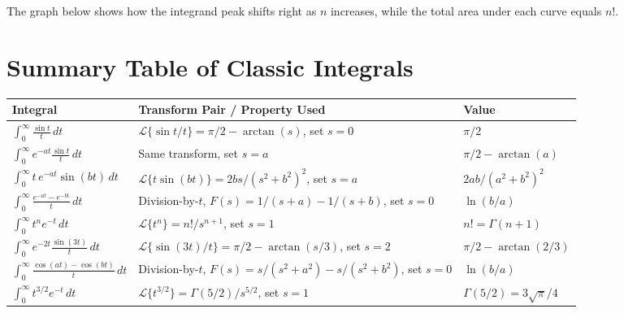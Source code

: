 \documentclass[12pt,a4paper]{article}
\begin{document}
The graph below shows how the integrand peak shifts right as $n$ increases, while
the total area under each curve equals $n!$.

\begin{center}
\end{center}

\section{Summary Table of Classic Integrals}

\begin{center}
\begin{tabular}{@{}p{5.5cm} p{5.5cm} p{3.5cm}@{}}
\toprule
\textbf{Integral} & \textbf{Transform Pair / Property Used} & \textbf{Value} \\
\midrule
$\displaystyle\int_0^\infty \frac{\sin t}{t}\, dt$
  & $\mathcal{L}\{\sin t/t\} = \pi/2 - \arctan(s)$, set $s = 0$
  & $\pi/2$ \\
\midrule
$\displaystyle\int_0^\infty e^{-at}\frac{\sin t}{t}\, dt$
  & Same transform, set $s = a$
  & $\pi/2 - \arctan(a)$ \\
\midrule
$\displaystyle\int_0^\infty t\,e^{-at}\sin(bt)\, dt$
  & $\mathcal{L}\{t\sin(bt)\} = 2bs/(s^2+b^2)^2$, set $s = a$
  & $2ab/(a^2+b^2)^2$ \\
\midrule
$\displaystyle\int_0^\infty \frac{e^{-at}-e^{-bt}}{t}\, dt$
  & Division-by-$t$, $F(s)=1/(s{+}a)-1/(s{+}b)$, set $s=0$
  & $\ln(b/a)$ \\
\midrule
$\displaystyle\int_0^\infty t^n e^{-t}\, dt$
  & $\mathcal{L}\{t^n\} = n!/s^{n+1}$, set $s = 1$
  & $n! = \Gamma(n+1)$ \\
\midrule
$\displaystyle\int_0^\infty e^{-2t}\frac{\sin(3t)}{t}\, dt$
  & $\mathcal{L}\{\sin(3t)/t\} = \pi/2-\arctan(s/3)$, set $s=2$
  & $\pi/2 - \arctan(2/3)$ \\
\midrule
$\displaystyle\int_0^\infty \frac{\cos(at)-\cos(bt)}{t}\, dt$
  & Division-by-$t$, $F(s)=s/(s^2+a^2)-s/(s^2+b^2)$, set $s=0$
  & $\ln(b/a)$ \\
\midrule
$\displaystyle\int_0^\infty t^{3/2} e^{-t}\, dt$
  & $\mathcal{L}\{t^{3/2}\} = \Gamma(5/2)/s^{5/2}$, set $s=1$
  & $\Gamma(5/2) = 3\sqrt{\pi}/4$ \\
\bottomrule
\end{tabular}
\end{center}
\end{document}
